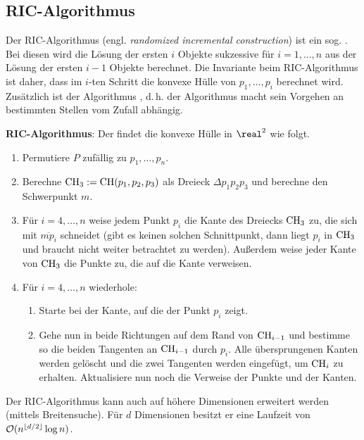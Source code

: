 \pagebreak

\subsection{%
    RIC-Algorithmus%
}

Der RIC-Algorithmus (engl. \emph{randomized incremental construction}) ist ein sog.
.
Bei diesen wird die Lösung der ersten $i$ Objekte sukzessive für $i = 1, \dotsc, n$ aus
der Lösung der ersten $i - 1$ Objekte berechnet.
Die Invariante beim RIC-Algorithmus ist daher, dass im $i$-ten Schritt die konvexe
Hülle von $p_1, \dotsc, p_i$ berechnet wird.
Zusätzlich ist der Algorithmus , d.\,h.
der Algorithmus macht sein Vorgehen an bestimmten Stellen vom Zufall abhängig.

\textbf{RIC-Algorithmus}:
Der  findet die konvexe Hülle in $\real^2$ wie folgt.
\begin{enumerate}
    \item
    Permutiere $P$ zufällig zu $p_1, \dotsc, p_n$.

    \item
    Berechne $\operatorname{CH}_3 := \operatorname{CH}(p_1, p_2, p_3)$ als Dreieck $\Delta p_1 p_2 p_3$ und
    berechne den Schwerpunkt $m$.

    \item
    Für $i = 4, \dotsc, n$ weise jedem Punkt $p_i$ die Kante des Dreiecks $\operatorname{CH}_3$ zu,
    die sich mit $\overline{mp_i}$ schneidet
    (gibt es keinen solchen Schnittpunkt, dann liegt $p_i$ in $\operatorname{CH}_3$ und braucht nicht weiter
    betrachtet zu werden).
    Außerdem weise jeder Kante von $\operatorname{CH}_3$ die Punkte zu, die auf die Kante verweisen.

    \item
    Für $i = 4, \dotsc, n$ wiederhole:
    \begin{enumerate}[label=\emph{(\roman*)}]
        \item
        Starte bei der Kante, auf die der Punkt $p_i$ zeigt.

        \item
        Gehe nun in beide Richtungen auf dem Rand von $\operatorname{CH}_{i-1}$ und bestimme so
        die beiden Tangenten an $\operatorname{CH}_{i-1}$ durch $p_i$.
        Alle übersprungenen Kanten werden gelöscht und die zwei Tangenten werden eingefügt,
        um $\operatorname{CH}_i$ zu erhalten.
        Aktualisiere nun noch die Verweise der Punkte und der Kanten.
    \end{enumerate}
\end{enumerate}
Der RIC-Algorithmus kann auch auf höhere Dimensionen erweitert werden
(mittels Breitensuche).
Für $d$ Dimensionen besitzt er eine Laufzeit von $\mathcal{O}(n^{\lfloor d/2 \rfloor} \log n)$.

